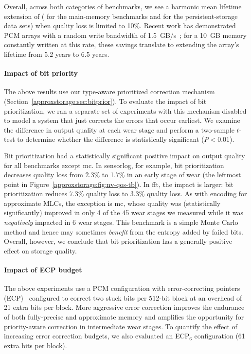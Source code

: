 \vskip 12pt
\noindent
Overall, across both categories of benchmarks, we see a harmonic mean
lifetime extension of 
( for the main-memory benchmarks and
 for
the persistent-storage data sets) when quality loss is limited to 10\%.
Recent work has demonstrated PCM arrays with a random write bandwidth of
1.5~GB/s~\cite{moneta};
for a 10~GB memory constantly written at this rate,
these savings translate to extending the array's lifetime
from 5.2 years to 6.5 years.

\paragraph{Impact of bit priority} The above results use our type-aware
prioritized correction mechanism (Section~\ref{approxstorage:sec:bitprior}). To evaluate the
impact of bit prioritization, we ran a separate set of experiments with this
mechanism disabled to model a system that just corrects the errors that
occur earliest. We examine the difference in output quality at each wear stage and
perform a two-sample $t$-test to determine whether the difference is
statistically significant ($P < 0.01$).

Bit prioritization had a statistically significant positive impact on output
quality for all benchmarks except \textsf{mc}. In \textsf{sensorlog}, for example, bit
prioritization decreases quality loss from 2.3\% to 1.7\% in an early stage of
wear (the leftmost point in Figure~\ref{approxstorage:fig:nv-qos-tb}). In \textsf{fft}, the
impact is larger: bit prioritization reduces 7.3\% quality loss to
3.3\% quality loss. As with encoding for approximate MLCs, the exception is \textsf{mc}, whose quality was
(statistically significantly) improved in
only 4 of the 45 wear stages we measured while it was \emph{negatively}
impacted in 6 wear stages. This benchmark is a simple Monte Carlo method
and hence may sometimes \emph{benefit} from the entropy added by failed bits.
Overall, however, we conclude that bit prioritization has a generally positive
effect on storage quality.

\paragraph{Impact of ECP budget} The above experiments use a PCM configuration
with error-correcting pointers (ECP)~\cite{ecp} configured to correct two stuck
bits per 512-bit block at an overhead of 21 extra bits per block. More
aggressive error correction improves the endurance of both fully-precise and
approximate memory and amplifies the opportunity for priority-aware
correction in intermediate wear stages. To quantify the effect of increasing
error correction budgets, we also evaluated an ECP$_6$ configuration (61 extra
bits per block).

